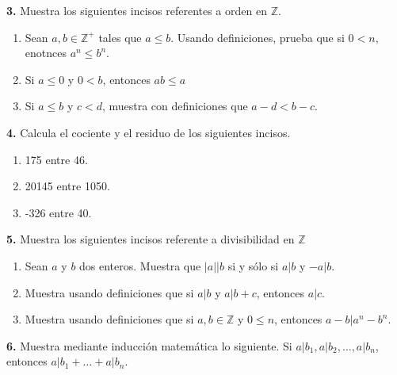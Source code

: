 \documentclass[12pt]{article}
\begin{document}
%
%
\textbf{3.} Muestra los siguientes incisos referentes a orden en $\mathbb{Z}$.
    \begin{enumerate}[label=\alph*)]
        \item Sean $a, b \in \mathbb{Z}^+$ tales que $a \leq b$. Usando definiciones, prueba que si $0 < n$, enotnces $a^n \leq b^n$. 

        \item Si $ a \leq 0$ y $0 < b$, entonces $ab \leq a$

        \item Si $a \leq b$ y $c < d$, muestra con definiciones que $a - d < b - c$.

    \end{enumerate}
\vspace{1cm}

%
%
\textbf{4.} Calcula el cociente y el residuo de los siguientes incisos.

    \begin{enumerate}[label=\alph*)]

        \item 175 entre 46.

        \item 20145 entre 1050.

        \item -326 entre 40.

    \end{enumerate}
\vspace{1cm}

%
%
\textbf{5.} Muestra los siguientes incisos referente a divisibilidad en $\mathbb{Z}$

    \begin{enumerate}[label=\alph*)]
        \item Sean $a$ y $b$ dos enteros. Muestra que $|a| | b$ si y sólo si $a | b$ y $-a |b$.

        \item Muestra usando definiciones que si $a | b$ y $a | b + c$, entonces $a | c$.

        \item Muestra usando definiciones que si $a , b \in \mathbb{Z}$ y $0 \leq n$, entonces $a - b | a^n - b^n$.
           \end{enumerate}

\vspace{1cm}

%
%
\textbf{6.} Muestra mediante inducción matemática lo siguiente. Si $a | b_1, a | b_2, \dots, a | b_n$, entonces $a | b_1 + \dots + a | b_n$.\\
\end{document}
